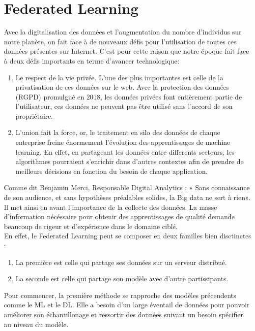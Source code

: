 \documentclass[12pt,a4paper]{report}
\begin{document}
\section{Federated Learning}

Avec la digitalisation des données et l'augmentation du nombre d'individus sur notre planète, on fait face à de nouveaux défis pour l'utilisation de toutes ces données présentes sur Internet. C'est pour cette raison que notre époque fait face à deux défis importants en terme d'avancer technologique: \\
\begin{enumerate}
\item Le respect de la vie privée. L'une des plus importantes est celle de la privatisation de ces données sur le web. Avec la protection des données (RGPD) promulgué en 2018, les données privées font entièrement partie de l'utilisateur, ces données ne peuvent pas être utilisé sans l'accord de son propriétaire.
\item L'union fait la force, or, le traitement en silo des données de chaque entreprise freine énormement l'évolution des apprentissages de machine learning. En effet, en partageant les données entre differents secteurs, les algorithmes pourraient s'enrichir dans d'autres contextes afin de prendre de meilleurs décisions en fonction du besoin de chaque application.
\end{enumerate}
Comme dit Benjamin Merci, Responsable Digital Analytics : « Sans connaissance de son audience, et sans hypothèses préalables solides, la Big data ne sert à rien». Il met ainsi en avant l'importance de la collecte des données. La masse d'information nécéssaire pour obtenir des apprentissages de qualité demande beaucoup de rigeur et d'expérience dans le domaine ciblé.\\

En effet, le Federated Learning peut se composer en deux familles bien disctinctes :
\begin{enumerate}
\item La première est celle qui partage ses données sur un serveur distribué.
\item La seconde est celle qui partage son modèle avec d'autre partissipants.
\end{enumerate}

Pour commencer, la première méthode se rapproche des modèles précendents comme le ML et le DL. Elle a besoin d'un large éventail de données pour pouvoir améliorer son échantillonage et ressortir des données suivant un besoin spécifier au niveau du modèle. 
\end{document}
